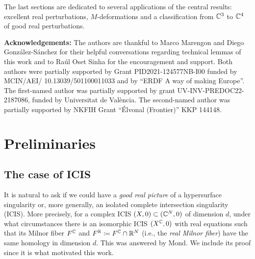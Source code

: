 \documentclass[a4paper,12pt]{amsart}
\begin{document}
The last sections are dedicated to several applications of the central results: excellent real perturbations, $M$-deformations and a classification from $\mathbb{C}^3$ to $\mathbb{C}^4$ of good real perturbations.
\newline

\textbf{Acknowledgements:} The authors are thankful to Marco Marengon and Diego González-Sánchez for their helpful conversations regarding technical lemmas of this work and to Raúl Oset Sinha for the encouragement and support. 
Both authors were partially supported by Grant PID2021-124577NB-I00 funded by MCIN/AEI/ 10.13039/501100011033 and by “ERDF A way of making Europe”. The first-named author was partially supported by grant UV-INV-PREDOC22-2187086, funded by Universitat de València.
The second-named author was partially supported by NKFIH Grant “Élvonal (Frontier)” KKP 144148. 

\section{Preliminaries}\label{sec:preliminaries}

\subsection{The case of ICIS}\label{sec:icis}

It is natural to ask if we could have a \textit{good real picture} of a hypersurface singularity or, more generally, an isolated complete intersection singularity (ICIS). More precisely, for a complex ICIS $(X,0)\subset(\mathbb{C}^N,0)$ of dimension $d$, under what circumstances there is an isomorphic ICIS $(X^{\mathbb{C}},0)$ with real equations such that its Milnor fiber $F^{\mathbb{C}}$ and $F^{\mathbb{R}}\coloneqq F^{\mathbb{C}}\cap\mathbb{R}^N$ (i.e., the \textsl{real Milnor fiber}) have the same homology in dimension $d$. This was answered by Mond. We include its proof since it is what motivated this work.
\end{document}
